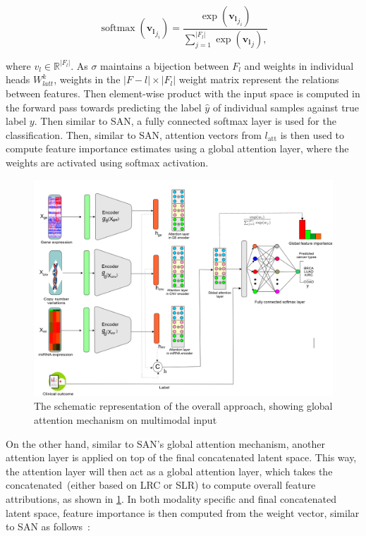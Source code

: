 \begin{equation}
    \operatorname{softmax}\left(\boldsymbol{v_l}_{j_{i}}\right)=\frac{\exp \left(\boldsymbol{v_l}_{j_{i}}\right)}{\sum_{j=1}^{|F_l|} \exp \left(\boldsymbol{v_l}_{j}\right),}
\end{equation}

\hspace*{3.5mm} where $v_l \in \mathbb{R}^{|F_l|}$. As $\sigma$ maintains a bijection between $F_l$ and weights in individual heads $W_{latt}^{k}$, weights in the $|F-l| \times|F_l|$ weight matrix represent the relations between features. Then element-wise product with the input space is computed in the forward pass towards predicting the label $\hat{y}$ of individual samples against true label ${y}$. Then similar to SAN, a fully connected softmax layer is used for the classification. Then, similar to SAN, attention vectors from $l_{\text {att}}$ is then used to compute feature importance estimates using a global attention layer, where the weights are activated using softmax activation. 

\begin{figure}
	\centering
	\includegraphics[scale=0.8]{images/full_attention.png}
	\caption[The schematic representation of the overall approach]{The schematic representation of the overall approach, showing global attention mechanism on multimodal input}
	\label{fig:all_attention}
\end{figure}

\hspace*{3.5mm} On the other hand, similar to SAN's global attention mechanism, another attention layer is applied on top of the final concatenated latent space. This way, the attention layer will then act as a global attention layer, which takes the concatenated~(either based on LRC or SLR) to compute overall feature attributions, as shown in \cref{fig:all_attention}. In both modality specific and final concatenated latent space, feature importance is then computed from the weight vector, similar to SAN as follows~\cite{vaswani2017attention}:


